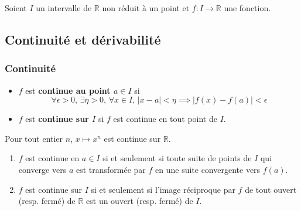 




  Soient $I$ un intervalle de $\mathbb{R}$ non réduit à un point et $f : I \rightarrow \mathbb{R}$ une fonction.

  \subsection{Continuité et dérivabilité}

  \subsubsection{Continuité}


  \begin{definition}
    \begin{itemize}
      \item $f$ est \textbf{continue au point $a \in I$} si
      \[ \forall \epsilon > 0, \, \exists \eta > 0, \, \forall x \in I, \, \vert x - a \vert < \eta \implies \vert f(x) - f(a) \vert < \epsilon \]
      \item $f$ est \textbf{continue sur $I$} si $f$ est continue en tout point de $I$.
    \end{itemize}
  \end{definition}

  \begin{example}
    Pour tout entier $n$, $x \mapsto x^n$ est continue sur $\mathbb{R}$.
  \end{example}

  \begin{theorem}
    \begin{enumerate}[label={\bfseries(\roman*)}]
      \item $f$ est continue en $a \in I$ si et seulement si toute suite de points de $I$ qui converge vers $a$ est transformée par $f$ en une suite convergente vers $f(a)$.
      \item $f$ est continue sur $I$ si et seulement si l'image réciproque par $f$ de tout ouvert (resp. fermé) de $\mathbb{R}$ est un ouvert (resp. fermé) de $I$.
    \end{enumerate}
  \end{theorem}

